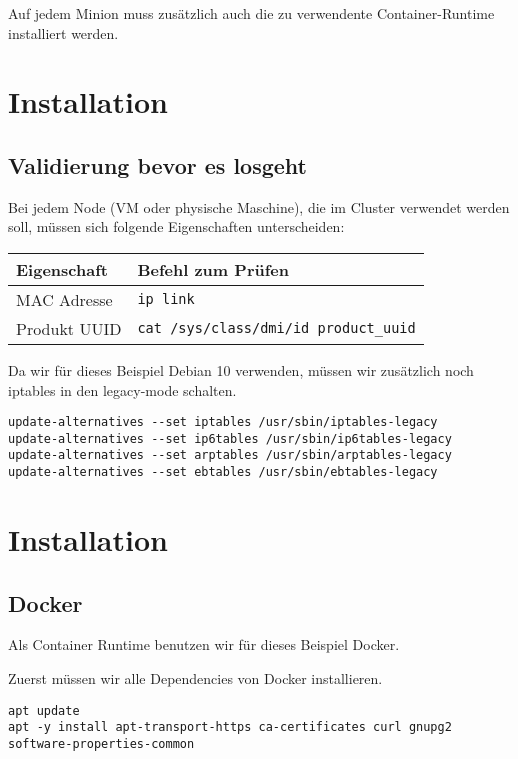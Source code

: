 Auf jedem Minion muss zusätzlich auch die zu verwendente
Container-Runtime installiert werden.

\hypertarget{installation}{%
\section{Installation}\label{installation}}

\hypertarget{validierung-bevor-es-losgeht}{%
\subsection{Validierung bevor es
losgeht}\label{validierung-bevor-es-losgeht}}

Bei jedem Node (VM oder physische Maschine), die im Cluster verwendet
werden soll, müssen sich folgende Eigenschaften unterscheiden:

\begin{longtable}[]{@{}ll@{}}
\toprule
Eigenschaft & Befehl zum Prüfen\tabularnewline
\midrule
\endhead
MAC Adresse & \texttt{ip\ link}\tabularnewline
Produkt UUID &
\texttt{cat\ /sys/class/dmi/id\ product\_uuid}\tabularnewline
\bottomrule
\end{longtable}

Da wir für dieses Beispiel Debian 10 verwenden, müssen wir zusätzlich
noch iptables in den legacy-mode schalten.

\begin{verbatim}
update-alternatives --set iptables /usr/sbin/iptables-legacy
update-alternatives --set ip6tables /usr/sbin/ip6tables-legacy
update-alternatives --set arptables /usr/sbin/arptables-legacy
update-alternatives --set ebtables /usr/sbin/ebtables-legacy
\end{verbatim}

\hypertarget{installation-1}{%
\section{Installation}\label{installation-1}}

\hypertarget{docker}{%
\subsection{Docker}\label{docker}}

Als Container Runtime benutzen wir für dieses Beispiel Docker.

Zuerst müssen wir alle Dependencies von Docker installieren.

\begin{verbatim}
apt update
apt -y install apt-transport-https ca-certificates curl gnupg2 software-properties-common
\end{verbatim}

